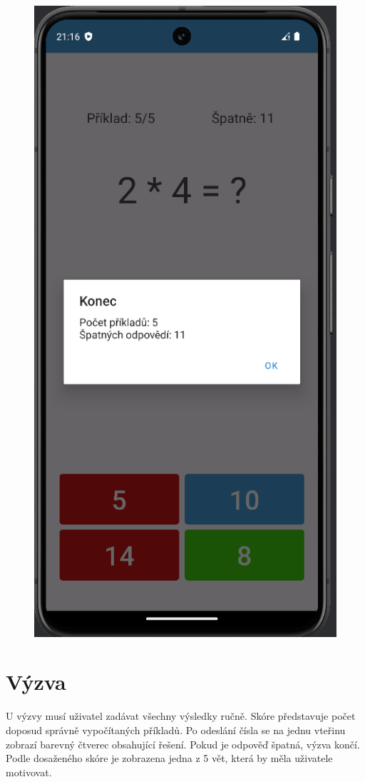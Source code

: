 \documentclass[12pt]{report}
\begin{document}
\begin{figure}[ht]
\begin{minipage}{.5\textwidth}
			\includegraphics[height=1.7\textwidth]{img/exercise_2}
			\label{fig:exercise_2}
		\end{minipage}
	\end{figure}
	
	\newpage
	\section{Výzva}
	U výzvy musí uživatel zadávat všechny výsledky ručně. Skóre představuje počet doposud správně vypočítaných příkladů. Po odeslání čísla se na jednu vteřinu zobrazí barevný čtverec obsahující řešení. Pokud je odpověď špatná, výzva končí. Podle dosaženého skóre je zobrazena jedna z 5 vět, která by měla uživatele motivovat.
	
\end{document}
